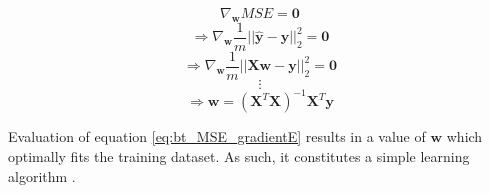 \begin{equation}
    \label{eq:bt_MSE_gradientB}
    \nabla_{\mathbf{w}}MSE=\mathbf{0}
\end{equation}
\begin{equation}
    \Rightarrow \nabla_{\mathbf{w}}\frac{1}{m}||\hat{\mathbf{y}}-\mathbf{y}||^2_2=\mathbf{0}
\end{equation}
\begin{equation}
    \Rightarrow \nabla_{\mathbf{w}}\frac{1}{m}||\mathbf{X}\mathbf{w}-\mathbf{y}||^2_2=\mathbf{0}
\end{equation}
\begin{equation*}
    \vdots
\end{equation*}
\begin{equation}
    \label{eq:bt_MSE_gradientE}
    \Rightarrow \mathbf{w}=(\mathbf{X}^T\mathbf{X})^{-1}\mathbf{X}^T\mathbf{y}
\end{equation}

Evaluation of equation \ref{eq:bt_MSE_gradientE} results in a value of $\mathbf{w}$ which optimally fits the training dataset. As such, it constitutes a simple learning algorithm \cite{goodfellow2016}.





